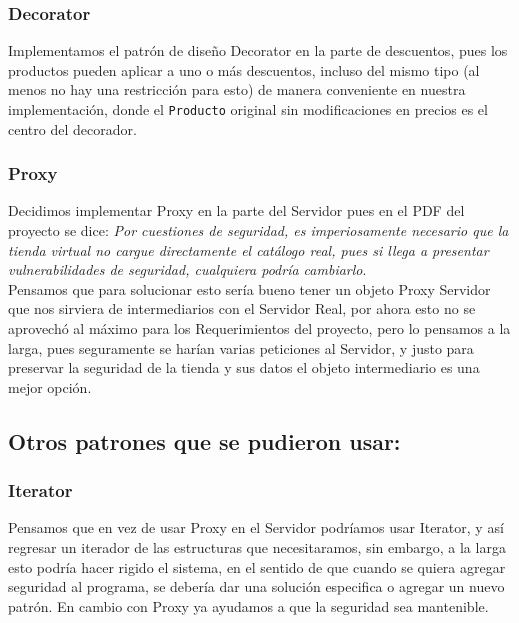 \documentclass{article}
\newcommand{\code}[1]{\textcolor{white!25!black}{\texttt{#1}}}
\begin{document}
\subsubsection*{Decorator}
Implementamos el patrón de diseño Decorator en la parte de descuentos, pues los productos
pueden aplicar a uno o más descuentos, incluso del mismo tipo (al menos no hay una restricción
para esto) de manera conveniente en nuestra implementación, donde el \code{Producto} original
sin modificaciones en precios es el centro del decorador.
\subsubsection*{Proxy}
Decidimos implementar Proxy en la parte del Servidor pues en el PDF del proyecto se dice: \textit{Por cuestiones de seguridad, es imperiosamente necesario que la tienda virtual no cargue directamente el catálogo real, pues si llega a presentar vulnerabilidades de seguridad, cualquiera podría cambiarlo}.\\
Pensamos que para solucionar esto sería bueno tener un objeto Proxy Servidor que nos sirviera de intermediarios con el Servidor Real, por ahora esto no se aprovechó al máximo para los Requerimientos del proyecto, pero lo pensamos a la larga, pues seguramente se harían varias peticiones al Servidor, y justo para preservar la seguridad de la tienda y sus datos el objeto intermediario es una mejor opción.\\



\subsection*{Otros patrones que se pudieron usar:}
\subsubsection*{Iterator}
Pensamos que en vez de usar Proxy en el Servidor podríamos usar Iterator, y así regresar un iterador de las estructuras que necesitaramos, sin embargo, a la larga esto podría hacer rigido el sistema, en el sentido de que cuando se quiera agregar seguridad al programa, se debería dar una solución especifica o agregar un nuevo patrón. En cambio con Proxy ya ayudamos a que la seguridad sea mantenible.
\end{document}
